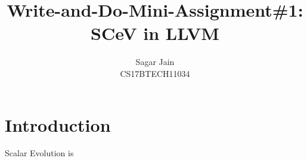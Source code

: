 \documentclass[12pt]{article}
\begin{document}
\title{Write-and-Do-Mini-Assignment\#1: SCeV in LLVM}
\author{Sagar Jain\\CS17BTECH11034}
\maketitle

\section*{Introduction}
Scalar Evolution is 
\end{document}

